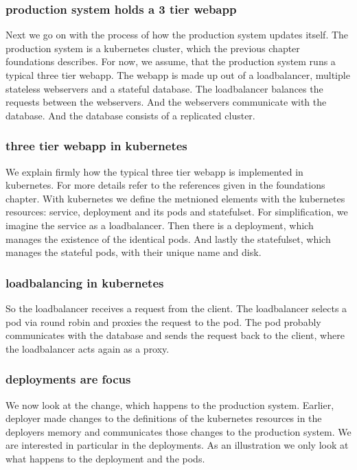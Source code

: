 \subsubsection{production system holds a 3 tier webapp}
Next we go on with the process of how the production system updates itself. The production
system is a kubernetes cluster, which the previous chapter foundations describes. For now,
we assume, that the production system runs a typical three tier webapp. The webapp is made
up out of a loadbalancer, multiple stateless webservers and a stateful database. The
loadbalancer balances the requests between the webservers. And the webservers communicate
with the database. And the database consists of a replicated cluster.

\subsubsection{three tier webapp in kubernetes}
We explain firmly how the typical three tier webapp is implemented in kubernetes. For more
details refer to the references given in the foundations chapter. With kubernetes we
define the metnioned elements with the kubernetes resources: service, deployment and its
pods and statefulset. For simplification, we imagine the service as a loadbalancer. Then
there is a deployment, which manages the existence of the identical pods. And lastly the
statefulset, which manages the stateful pods, with their unique name and disk.

\subsubsection{loadbalancing in kubernetes}
So the loadbalancer receives a request from the client. The loadbalancer selects a pod via
round robin and proxies the request to the pod. The pod probably communicates with the
database and sends the request back to the client, where the loadbalancer acts again as
a proxy.

\subsubsection{deployments are focus}
We now look at the change, which happens to the production system. Earlier, deployer made
changes to the definitions of the kubernetes resources in the deployers memory and
communicates those changes to the production system. We are interested in particular in
the deployments. As an illustration we only look at what happens to the deployment and the
pods.

